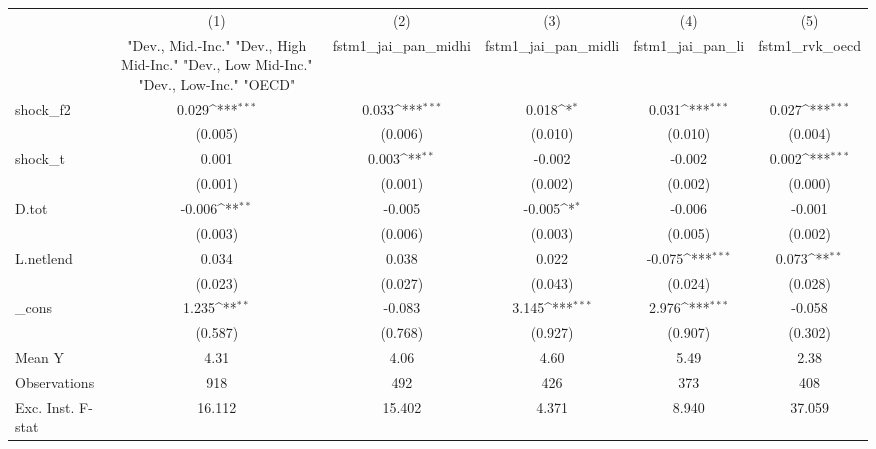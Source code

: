 {
\def\sym#1{\ifmmode^{#1}\else\(^{#1}\)\fi}
\begin{tabular}{l*{5}{c}}
\toprule
            &\multicolumn{1}{c}{(1)}&\multicolumn{1}{c}{(2)}&\multicolumn{1}{c}{(3)}&\multicolumn{1}{c}{(4)}&\multicolumn{1}{c}{(5)}\\
            &\multicolumn{1}{c}{ "Dev., Mid.-Inc." "Dev., High Mid-Inc." "Dev., Low Mid-Inc." "Dev., Low-Inc." "OECD" }&\multicolumn{1}{c}{fstm1\_jai\_pan\_midhi}&\multicolumn{1}{c}{fstm1\_jai\_pan\_midli}&\multicolumn{1}{c}{fstm1\_jai\_pan\_li}&\multicolumn{1}{c}{fstm1\_rvk\_oecd}\\
\midrule
shock\_f2    &       0.029\sym{***}&       0.033\sym{***}&       0.018\sym{*}  &       0.031\sym{***}&       0.027\sym{***}\\
            &     (0.005)         &     (0.006)         &     (0.010)         &     (0.010)         &     (0.004)         \\
\addlinespace
shock\_t     &       0.001         &       0.003\sym{**} &      -0.002         &      -0.002         &       0.002\sym{***}\\
            &     (0.001)         &     (0.001)         &     (0.002)         &     (0.002)         &     (0.000)         \\
\addlinespace
D.tot       &      -0.006\sym{**} &      -0.005         &      -0.005\sym{*}  &      -0.006         &      -0.001         \\
            &     (0.003)         &     (0.006)         &     (0.003)         &     (0.005)         &     (0.002)         \\
\addlinespace
L.netlend   &       0.034         &       0.038         &       0.022         &      -0.075\sym{***}&       0.073\sym{**} \\
            &     (0.023)         &     (0.027)         &     (0.043)         &     (0.024)         &     (0.028)         \\
\addlinespace
\_cons      &       1.235\sym{**} &      -0.083         &       3.145\sym{***}&       2.976\sym{***}&      -0.058         \\
            &     (0.587)         &     (0.768)         &     (0.927)         &     (0.907)         &     (0.302)         \\
\midrule
Mean Y      &        4.31         &        4.06         &        4.60         &        5.49         &        2.38         \\
Observations&         918         &         492         &         426         &         373         &         408         \\
Exc. Inst. F-stat&      16.112         &      15.402         &       4.371         &       8.940         &      37.059         \\
\bottomrule
\end{tabular}
}
